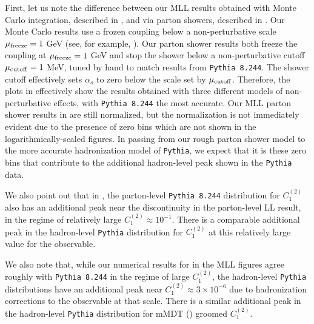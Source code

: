 \documentclass[letterpaper,11pt]{article}
\begin{document}
First, let us note the difference between our MLL results obtained with Monte Carlo integration, described in , and via parton showers, described in .
%
Our Monte Carlo results use a frozen coupling below a non-perturbative scale \(\mu_{\rm freeze} = 1\) GeV (see, for example, ). Our parton shower results both freeze the coupling at \(\mu_{\rm freeze} = 1\) GeV and stop the shower below a non-perturbative cutoff \(\mu_{\rm cutoff} = 1\) MeV, tuned by hand to match results from \texttt{Pythia 8.244}.
%
The shower cutoff effectively sets \(\alpha_s\) to zero below the scale set by \(\mu_{\rm cutoff}\).
%
Therefore, the plots in  effectively show the results obtained with three different models of non-perturbative effects, with \texttt{Pythia 8.244} the most accurate.
%
Our MLL parton shower results in  are still normalized, but the normalization is not immediately evident due to the presence of zero bins which are not shown in the logarithmically-scaled figures.
%
In passing from our rough parton shower model to the more accurate hadronization model of \texttt{Pythia}, we expect that it is these zero bins that contribute to the additional hadron-level peak shown in the \texttt{Pythia} data.

We also point out that in , the parton-level \texttt{Pythia 8.244} distribution for \(C_1^{(2)}\) also has an additional peak near the discontinuity in the parton-level LL result, in the regime of relatively large \(C_1^{(2)} \approx 10^{-1}\).
%
There is a comparable additional peak in the hadron-level \texttt{Pythia} distribution for \(C_1^{(2)}\) at this relatively large value for the observable.

We also note that, while our numerical results for  in the MLL figures agree roughly with \texttt{Pythia 8.244} in the regime of large \(C_1^{(2)}\), the hadron-level \texttt{Pythia} distributions have an additional peak near \(C_1^{(2)} \approx 3\times 10^{-6}\) due to hadronization corrections to the observable at that scale.
%
There is a similar additional peak in the hadron-level \texttt{Pythia} distribution for mMDT () groomed \(C_1^{(2)}\).
\end{document}
